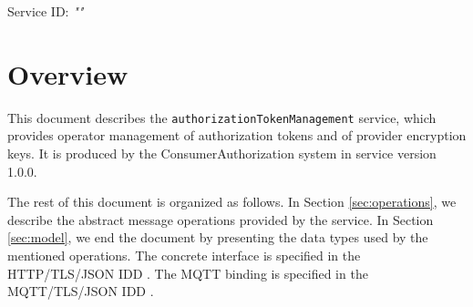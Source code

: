 \documentclass[a4paper]{arrowhead}
\begin{document}
\sloppy

\ArrowheadSetup

\begin{center}
  \vspace*{1cm}
  \huge{\arrowtitle}

  \vspace*{0.2cm}
  \LARGE{\arrowtype}
  \vspace*{1cm}

  \Large{Service ID: \textit{"\arrowid"}}

  \vspace*{\fill}


  \vspace*{1cm}
  \vspace*{\fill}

  \begin{abstract}
    This document describes the \texttt{authorization\allowbreak{}Token\allowbreak{}Management} service, version 1.0.0, produced by the ConsumerAuthorization core system of Arrowhead 5.2.2.
  \end{abstract}

  \vspace*{1cm}
\end{center}

\newpage

\tableofcontents
\newpage

\section{Overview}
\label{sec:overview}

This document describes the \texttt{authorization\allowbreak{}Token\allowbreak{}Management} service, which provides operator management of authorization tokens and of provider encryption keys.
It is produced by the ConsumerAuthorization system \cite{ca-sysd} in service version 1.0.0.

The rest of this document is organized as follows.
In Section \ref{sec:operations}, we describe the abstract message operations provided by the service.
In Section \ref{sec:model}, we end the document by presenting the data types used by the mentioned operations.
The concrete interface is specified in the HTTP/TLS/JSON IDD \cite{ca-authorizationTokenManagement-http-idd}. The MQTT binding is specified in the MQTT/TLS/JSON IDD \cite{ca-authorizationTokenManagement-mqtt-idd}.
\end{document}
